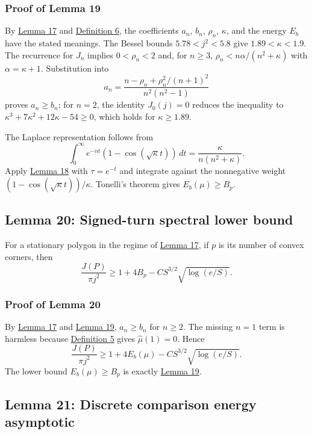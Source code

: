 \documentclass[11pt]{article}
\begin{document}
\subsubsection{Proof of Lemma 19}\label{proof-lem-kernel-comparison}

By \hyperref[lem-spectral-core]{Lemma 17} and
\hyperref[def-positive-kernel]{Definition 6}, the coefficients \(a_n\),
\(b_n\), \(\rho_n\), \(\kappa\), and the energy \(E_b\) have the stated
meanings. The Bessel bounds \(5.78<j^2<5.8\) give \(1.89<\kappa<1.9\).
The recurrence for \(J_n\) implies \(0<\rho_n<2\) and, for \(n\ge3\),
\(\rho_n<n\alpha/(n^2+\kappa)\) with \(\alpha=\kappa+1\). Substitution
into \[
a_n=\frac{n-\rho_n+\rho_n^2/(n+1)^2}{n^2(n^2-1)}
\] proves \(a_n\ge b_n\); for \(n=2\), the identity \(J_0(j)=0\) reduces
the inequality to \(\kappa^3+7\kappa^2+12\kappa-54\ge0\), which holds
for \(\kappa\ge1.89\).

The Laplace representation follows from \[
\int_0^\infty e^{-nt}(1-\cos(\sqrt\kappa t))\,dt=\frac{\kappa}{n(n^2+\kappa)}.
\] Apply \hyperref[lem-toeplitz-positive-atoms]{Lemma 18} with
\(\tau=e^{-t}\) and integrate against the nonnegative weight
\((1-\cos(\sqrt\kappa t))/\kappa\). Tonelli's theorem gives
\(E_b(\mu)\ge B_p\).

\subsection{Lemma 20: Signed-turn spectral lower
bound}\label{lem-signed-turn-lower-bound}

For a stationary polygon in the regime of
\hyperref[lem-spectral-core]{Lemma 17}, if \(p\) is its number of convex
corners, then \[
\frac{J(P)}{\pi j^2}\ge1+4B_p-C S^{3/2}\sqrt{\log(e/S)}.
\]

\subsubsection{Proof of Lemma
20}\label{proof-lem-signed-turn-lower-bound}

By \hyperref[lem-spectral-core]{Lemma 17} and
\hyperref[lem-kernel-comparison]{Lemma 19}, \(a_n\ge b_n\) for
\(n\ge2\). The missing \(n=1\) term is harmless because
\hyperref[def-turn-measure]{Definition 5} gives \(\widehat\mu(1)=0\).
Hence \[
\frac{J(P)}{\pi j^2}\ge 1+4E_b(\mu)-C S^{3/2}\sqrt{\log(e/S)}.
\] The lower bound \(E_b(\mu)\ge B_p\) is exactly
\hyperref[lem-kernel-comparison]{Lemma 19}.

\subsection{Lemma 21: Discrete comparison energy
asymptotic}\label{lem-bp-asymptotic}
\end{document}

